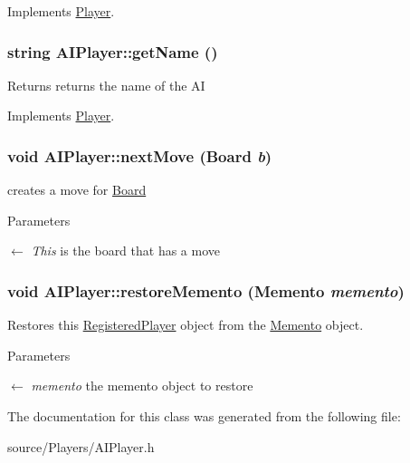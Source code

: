 Implements \hyperlink{classPlayer_ae0b947230fe2f09d96f273798f19cf0d}{Player}.\hypertarget{classAIPlayer_aaa733d49ac2e937a25d53a3b238fb3a8}{
\subsubsection[{getName}]{\setlength{\rightskip}{0pt plus 5cm}string AIPlayer::getName ()}}
\label{classAIPlayer_aaa733d49ac2e937a25d53a3b238fb3a8}
\begin{DoxyReturn}{Returns}
returns the name of the AI 
\end{DoxyReturn}


Implements \hyperlink{classPlayer}{Player}.\hypertarget{classAIPlayer_adb32c66ce4ba140188676aeea0317d36}{
\subsubsection[{nextMove}]{\setlength{\rightskip}{0pt plus 5cm}void AIPlayer::nextMove ({\bf Board} {\em b})}}
\label{classAIPlayer_adb32c66ce4ba140188676aeea0317d36}


creates a move for \hyperlink{classBoard}{Board} 
\begin{DoxyParams}{Parameters}
\item[\mbox{$\leftarrow$} {\em This}]is the board that has a move \end{DoxyParams}
\hypertarget{classAIPlayer_a41aa8bd7a1d09ba00f1e6fa65083a248}{
\subsubsection[{restoreMemento}]{\setlength{\rightskip}{0pt plus 5cm}void AIPlayer::restoreMemento ({\bf Memento} {\em memento})}}
\label{classAIPlayer_a41aa8bd7a1d09ba00f1e6fa65083a248}


Restores this \hyperlink{classRegisteredPlayer}{RegisteredPlayer} object from the \hyperlink{classMemento}{Memento} object. 
\begin{DoxyParams}{Parameters}
\item[\mbox{$\leftarrow$} {\em memento}]the memento object to restore \end{DoxyParams}


The documentation for this class was generated from the following file:\begin{DoxyCompactItemize}
\item 
source/Players/AIPlayer.h\end{DoxyCompactItemize}
